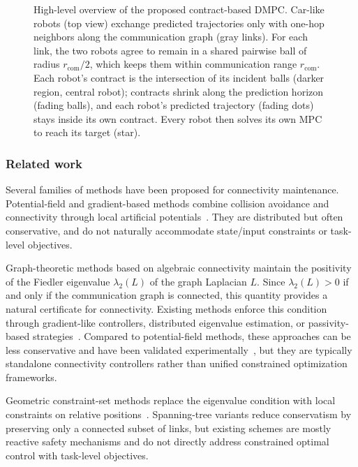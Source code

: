 \documentclass[letterpaper, 10 pt, conference]{ieeeconf}  %
\begin{document}
\begin{figure}[!t]
	\caption{High-level overview of the proposed contract-based DMPC. Car-like
		robots (top view) exchange predicted trajectories only with one-hop
		neighbors along the communication graph (gray links). For each
		link, the two robots agree to remain in a shared pairwise ball
		of radius $r_{\mathrm{com}}/2$, which keeps them within communication
		range $r_{\mathrm{com}}$. Each robot's contract is the
		intersection of its incident balls (darker region, central robot);
		contracts shrink along the prediction horizon (fading balls), and each
		robot's predicted trajectory (fading dots) stays inside its own
		contract. Every robot then solves its own MPC to reach its target
		(star).}
	\label{fig:concept}
\end{figure}

\subsubsection*{Related work}
Several families of methods have been proposed for connectivity maintenance. Potential-field and gradient-based methods combine collision avoidance and connectivity through local artificial potentials~\cite{zavlanos2007potential,hsieh2008maintaining}. They are distributed but often conservative, and do not naturally accommodate state/input constraints or task-level objectives.

Graph-theoretic methods based on algebraic connectivity maintain the positivity
of the Fiedler eigenvalue $\lambda_2(L)$ of the graph Laplacian $L$.
Since $\lambda_2(L)>0$ if and only if the
communication graph is connected, this quantity provides a natural certificate
for connectivity. Existing methods enforce this condition through gradient-like
controllers, distributed eigenvalue estimation, or passivity-based
strategies~\cite{bullo2018lectures,mohar1991laplacian,degennaro2006decentralized,zavlanos2005controlling,yang2010decentralized,sabattini2012decentralized,zavlanos2011graph,ji2007distributed,giordano2013passivity}.
Compared to potential-field methods, these approaches can be less conservative and have been validated experimentally~\cite{giordano2013passivity}, but they are typically standalone connectivity controllers rather than unified constrained optimization frameworks.

Geometric constraint-set methods replace the eigenvalue condition with local
constraints on relative positions~\cite{ando1999distributed,notarstefano2006maintaining,spanos2004robust}.
Spanning-tree variants reduce conservatism by preserving only a connected subset
of links, but existing schemes are mostly reactive safety mechanisms and do not
directly address constrained optimal control with task-level objectives.
\end{document}
